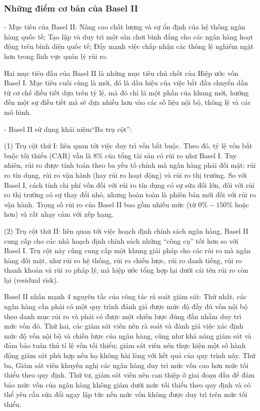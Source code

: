 \subsubsection{Những điểm cơ bản của Basel II}

- Mục tiêu của Basel II: Nâng cao chất lượng và sự ổn định của hệ thống ngân hàng quốc tế; Tạo lập và duy trì một sân chơi bình đẳng cho các ngân hàng hoạt động trên bình diện quốc tế; Đẩy mạnh việc chấp nhận các thông lệ nghiêm ngặt hơn trong lĩnh vực quản lý rủi ro.

Hai mục tiêu đầu của Basel II là những mục tiêu chủ chốt của Hiệp ước vốn Basel I. Mục tiêu cuối cùng là mới, đó là dấu hiệu của việc bắt đầu chuyển dần từ cơ chế điều tiết dựa trên tỷ lệ, mà đó chỉ là một phần của khung mới, hướng đến một sự điều tiết mà sẽ dựa nhiều hơn vào các số liệu nội bộ, thông lệ và các mô hình.

- Basel II sử dụng khái niệm“Ba trụ cột”:

(1) Trụ cột thứ I: liên quan tới việc duy trì vốn bắt buộc. Theo đó, tỷ lệ vốn bắt buộc tối thiểu (CAR) vẫn là $8\%$ của tổng tài sản có rủi ro như Basel I. Tuy nhiên, rủi ro được tính toán theo ba yếu tố chính mà ngân hàng phải đối mặt: rủi ro tín dụng, rủi ro vận hành (hay rủi ro hoạt động) và rủi ro thị trường. So với Basel I, cách tính chi phí vốn đối với rủi ro tín dụng có sự sửa đổi lớn, đối với rủi ro thị trường có sự thay đổi nhỏ, nhưng hoàn toàn là phiên bản mới đối với rủi ro vận hành. Trọng số rủi ro của Basel II bao gồm nhiều mức (từ $0\% -150\%$ hoặc hơn) và rất nhạy cảm với xếp hạng.

(2) Trụ cột thứ II: liên quan tới việc hoạch định chính sách ngân hàng, Basel II cung cấp cho các nhà hoạch định chính sách những “công cụ” tốt hơn so với Basel I. Trụ cột này cũng cung cấp một khung giải pháp cho các rủi ro mà ngân hàng đối mặt, như rủi ro hệ thống, rủi ro chiến lược, rủi ro danh tiếng, rủi ro thanh khoản và rủi ro pháp lý, mà hiệp ước tổng hợp lại dưới cái tên rủi ro còn lại (residual risk).

Basel II nhấn mạnh 4 nguyên tắc của công tác rà soát giám sát: Thứ nhất, các ngân hàng cần phải có một quy trình đánh giá được mức độ đầy đủ vốn nội bộ theo danh mục rủi ro và phải có được một chiến lược đúng đắn nhằm duy trì mức vốn đó. Thứ hai, các giám sát viên nên rà soát và đánh giá việc xác định mức độ vốn nội bộ và chiến lược của ngân hàng, cũng như khả năng giám sát và đảm bảo tuân thủ tỉ lệ vốn tối thiểu; giám sát viên nên thực hiện một số hành động giám sát phù hợp nếu họ không hài lòng với kết quả của quy trình này. Thứ ba, Giám sát viên khuyến nghị các ngân hàng duy trì mức vốn cao hơn mức tối thiểu theo quy định. Thứ tư, giám sát viên nên can thiệp ở giai đoạn đầu để đảm bảo mức vốn của ngân hàng không giảm dưới mức tối thiểu theo quy định và có thể yêu cầu sửa đổi ngay lập tức nếu mức vốn không được duy trì trên mức tối thiểu.

